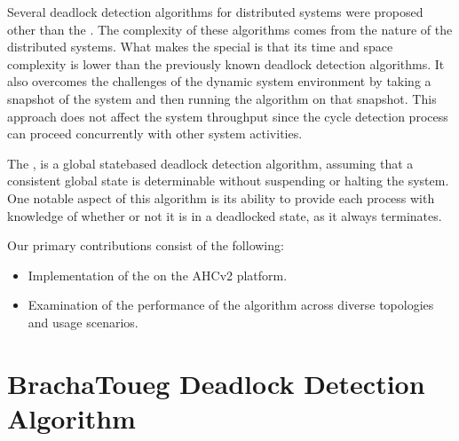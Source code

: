\documentclass[letterpaper,10pt,english]{sphinxmanual}
\begin{document}
\sphinxAtStartPar
Several deadlock detection algorithms for distributed systems were proposed other than the {\hyperref[\detokenize{docs/BrachaToueg/algorithm:brachatouegdeadlockdetectionalgorithm}]{}}. The complexity of these algorithms comes from the nature of the distributed systems. What makes the {\hyperref[\detokenize{docs/BrachaToueg/algorithm:brachatouegdeadlockdetectionalgorithm}]{}} special is that its time and space complexity is lower than the previously known deadlock detection algorithms. It also overcomes the challenges of the dynamic system environment by taking a snapshot of the system and then running the algorithm on that snapshot. This approach does not affect the system throughput since the cycle detection process can proceed concurrently with other system activities.

\sphinxAtStartPar
The {\hyperref[\detokenize{docs/BrachaToueg/algorithm:brachatouegdeadlockdetectionalgorithm}]{}}, is a global state\sphinxhyphen{}based deadlock detection algorithm, assuming that a consistent global state is determinable without suspending or halting the system. One notable aspect of this algorithm is its ability to provide each process with knowledge of whether or not it is in a deadlocked state, as it always terminates.

\sphinxAtStartPar
Our primary contributions consist of the following:
\begin{itemize}
\item {} 
\sphinxAtStartPar
Implementation of the {\hyperref[\detokenize{docs/BrachaToueg/algorithm:brachatouegdeadlockdetectionalgorithm}]{}} on the AHCv2 platform.

\item {} 
\sphinxAtStartPar
Examination of the performance of the algorithm across diverse topologies and usage scenarios.

\end{itemize}

\sphinxstepscope


\section{Bracha\sphinxhyphen{}Toueg Deadlock Detection Algorithm}
\label{\detokenize{docs/BrachaToueg/algorithm:brachatouegalg}}\label{\detokenize{docs/BrachaToueg/algorithm::doc}}
\end{document}
